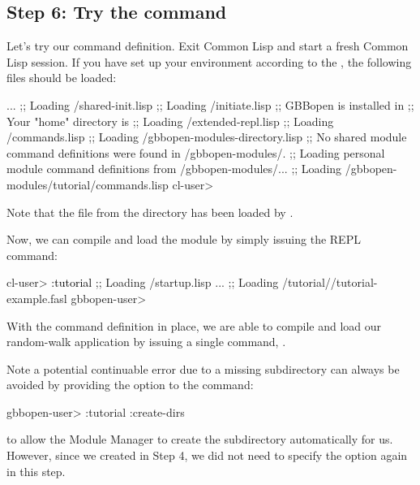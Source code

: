 \documentclass[10pt,twoside,english,pdftex]{article}
\begin{document}
\subsection*{Step 6: Try the  command}

Let's try our command definition.  Exit Common Lisp and start a fresh
Common Lisp session.  If you have set up your environment according to the
,
the following files should be loaded:
%
\W\supp
\begin{example}
\textcolor{darkergray}{%
     ...
  ;; Loading /shared-init.lisp
  ;;   Loading /initiate.lisp
  ;; GBBopen is installed in 
  ;; Your "home" directory is 
  ;;     Loading /extended-repl.lisp
  ;;     Loading /commands.lisp
  ;;     Loading /gbbopen-modules-directory.lisp
  ;; No shared module command definitions were found in /gbbopen-modules/.
  ;; Loading personal module command definitions from /gbbopen-modules/...
  ;;     Loading /gbbopen-modules/tutorial/commands.lisp
  cl-user>}
\end{example}
%
Note that the  file from the 
directory has been loaded by
.

Now, we can compile and load the  module by simply issuing the
 REPL command:
%
\W\supp
\begin{example}
\textcolor{darkergray}{%
  cl-user> \textcolor{black}{:tutorial}
  ;; Loading /startup.lisp
     ...
  ;; Loading /tutorial//tutorial-example.fasl
  gbbopen-user>}
\end{example}
%
With the command definition in place, we are able to compile and load our
random-walk application by issuing a single command, .

Note a potential continuable error due to a missing
 subdirectory can always be avoided by
providing the  option to the  command:
%
\W\supp
\begin{example}
\textcolor{darkergray}{%
  gbbopen-user> :tutorial :create-dirs}
\end{example}
%
to allow the Module Manager to create the 
subdirectory automatically for us.  However, since we created
 in Step 4, we did not need to specify the
 option again in this step.
\end{document}
